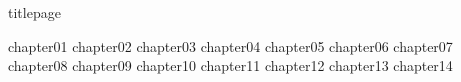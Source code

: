 \documentclass[
	,a4paper
	,12pt
	,oneside
]{book}
\begin{document}
\frontmatter
	{titlepage}
	\restoregeometry
	\tableofcontents

\mainmatter

	{chapter01}
	{chapter02}
	{chapter03}
	{chapter04}
	{chapter05}
	{chapter06}
	{chapter07}
	{chapter08}
	{chapter09}
	{chapter10}
	{chapter11}
	{chapter12}
	{chapter13}
	{chapter14}

\backmatter
\end{document}
